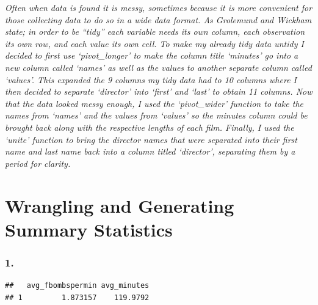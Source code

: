 \documentclass[]{article}
\newenvironment{Shaded}{\begin{snugshade}}{\end{snugshade}}
\newcommand{\DataTypeTok}[1]{\textcolor[rgb]{0.13,0.29,0.53}{#1}}
\newcommand{\DecValTok}[1]{\textcolor[rgb]{0.00,0.00,0.81}{#1}}
\newcommand{\KeywordTok}[1]{\textcolor[rgb]{0.13,0.29,0.53}{\textbf{#1}}}
\newcommand{\NormalTok}[1]{#1}
\newcommand{\OperatorTok}[1]{\textcolor[rgb]{0.81,0.36,0.00}{\textbf{#1}}}
\newcommand{\StringTok}[1]{\textcolor[rgb]{0.31,0.60,0.02}{#1}}
\begin{document}
\emph{Often when data is found it is messy, sometimes because it is more
convenient for those collecting data to do so in a wide data format. As
Grolemund and Wickham state; in order to be ``tidy'' each variable needs
its own column, each observation its own row, and each value its own
cell. To make my already tidy data untidy I decided to first use
`pivot\_longer' to make the column title `minutes' go into a new column
called `names' as well as the values to another separate column called
`values'. This expanded the 9 columns my tidy data had to 10 columns
where I then decided to separate `director' into `first' and `last' to
obtain 11 columns. Now that the data looked messy enough, I used the
`pivot\_wider' function to take the names from `names' and the values
from `values' so the minutes column could be brought back along with the
respective lengths of each film. Finally, I used the `unite' function to
bring the director names that were separated into their first name and
last name back into a column titled `director', separating them by a
period for clarity.}

\hypertarget{wrangling-and-generating-summary-statistics}{%
\section{Wrangling and Generating Summary
Statistics}\label{wrangling-and-generating-summary-statistics}}

\hypertarget{section}{%
\subsubsection{1.}\label{section}}

\begin{Shaded}
\end{Shaded}

\begin{verbatim}
##   avg_fbombspermin avg_minutes
## 1         1.873157    119.9792
\end{verbatim}
\end{document}

